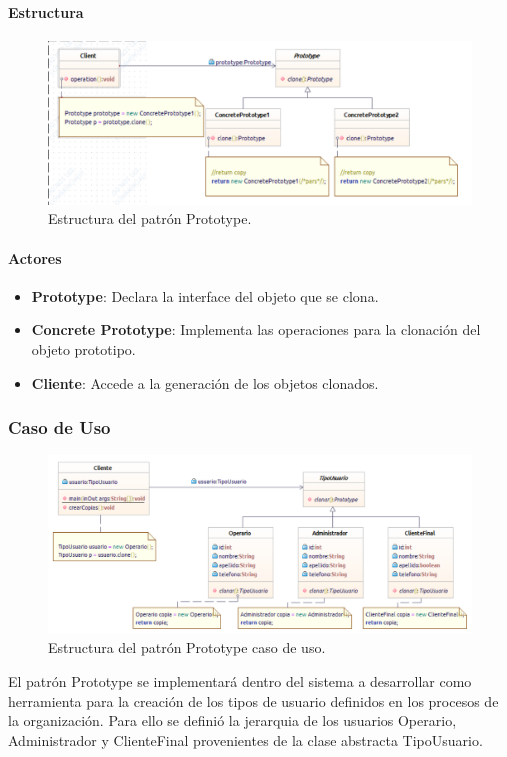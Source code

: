 \paragraph{Estructura}

\begin{figure}[h]
	\centering
	\includegraphics[width=.7\linewidth]{imagenes/Patrones/Prototype.pdf}
	\caption{Estructura del patrón Prototype.\cite{gof}}	
\end{figure}

\paragraph{Actores}

\begin{itemize}
	\item \textbf{Prototype}: Declara la interface del objeto que se clona.
	\item \textbf{Concrete Prototype}: Implementa las operaciones para la clonación del objeto prototipo.
	\item \textbf{Cliente}: Accede a la generación de los objetos clonados.
\end{itemize}


\subsubsection{Caso de Uso}

\begin{figure}[th!]
	\centering
	\includegraphics[width=.7\linewidth]{imagenes/Patrones/Prototype_caso.pdf}
	\caption{Estructura del patrón Prototype caso de uso.\cite{gof}}	
\end{figure}

El patrón Prototype se implementará dentro del sistema a desarrollar como herramienta para la creación de los tipos de usuario definidos en los procesos de la organización. Para ello se definió la jerarquia de los usuarios Operario, Administrador y ClienteFinal provenientes de la clase abstracta TipoUsuario.

